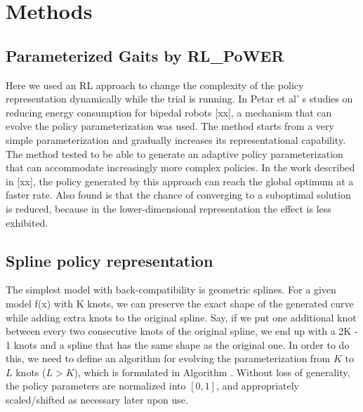 \section{Methods}



\subsection{Parameterized Gaits by RL\_PoWER}

Here we used an RL approach to change the complexity of the policy
representation dynamically while the trial is running. In Petar et al’
s studies on reducing energy consumption for bipedal robots [xx], a
mechanism that can evolve the policy parameterization was used. The
method starts from a very simple parameterization and gradually
increases its representational capability. The method tested to be
able to generate an adaptive policy parameterization that can
accommodate increasingly more complex policies. In the work described
in [xx], the policy generated by this approach can reach the global
optimum at a faster rate. Also found is that the chance of converging
to a suboptimal solution is reduced, because in the lower-dimensional
representation the effect is less exhibited.



\subsection{Spline policy representation}

The simplest model with back-compatibility is geometric
splines. For a given model f(x) with K knots, we can preserve the
exact shape of the generated curve while adding extra knots to the
original spline. Say, if we put one additional knot between every two
consecutive knots of the original spline, we end up with a 2K - 1
knots and a spline that has the same shape as the original one. In
order to do this, we need to define an algorithm for evolving the
parameterization from $K$ to $L$ knots ($L > K$), which is formulated in
Algorithm .  Without loss of generality, the policy parameters are
normalized into $[0, 1]$, and appropriately scaled/shifted as necessary
later upon use.


